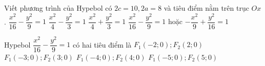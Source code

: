\begin{ex}%
	Viết phương trình của Hypebol có $2c = 10, 2a = 8$ và tiêu điểm nằm trên trục $Ox$.
	\choice
	{\True $\dfrac{x^2}{16}-\dfrac{y^2}{9}=1$}
	{$\dfrac{x^2}{4}-\dfrac{y^2}{3}=1$}
	{$\dfrac{x^2}{4}+\dfrac{y^2}{3}=1$}
	{$\dfrac{x^2}{16}-\dfrac{y^2}{9}=1$ hoặc $-\dfrac{x^2}{9}+\dfrac{y^2}{16}=1$}
\end{ex}

\begin{ex}%
	Hypebol $\dfrac{x^2}{16}-\dfrac{y^2}{9}=1$ có hai tiêu điểm là
	\choice
	{$F_1(-2;0);F_2(2;0)$}
	{$F_1(-3;0);F_2(3;0)$}
	{$F_1(-4;0);F_2(4;0)$}
	{\True $F_1(-5;0);F_2(5;0)$}
\end{ex}


